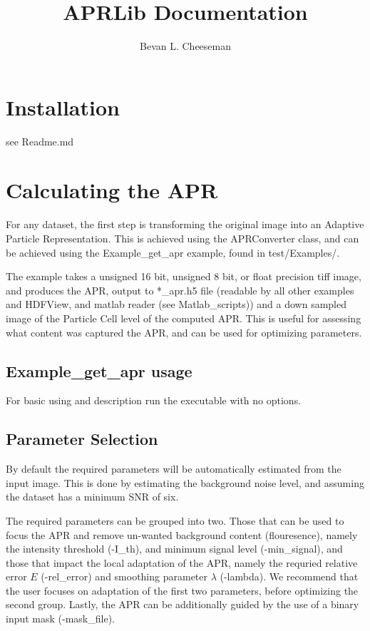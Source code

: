 \documentclass[12pt]{article}
\title{APRLib Documentation}
\author
{Bevan L. Cheeseman}
\begin{document}
\maketitle

\section{Installation}
see Readme.md

\section{Calculating the APR}
For any dataset, the first step is transforming the original image into an Adaptive Particle Representation. This is achieved using the APRConverter class, and can be achieved using the Example\_get\_apr example, found in test/Examples/.

The example takes a unsigned 16 bit, unsigned 8 bit, or float precision tiff image, and produces the APR, output to  *\_apr.h5 file (readable by all other examples and HDFView, and matlab reader (see Matlab\_scripts)) and a down sampled image of the Particle Cell level of the computed APR. This is useful for assessing what content was captured the APR, and can be used for optimizing parameters.
\subsection{Example\_get\_apr usage}
For basic using and description run the executable with no options.
\subsection{Parameter Selection}
By default the required parameters will be automatically estimated from the input image. This is done by estimating the background noise level, and assuming the dataset has a minimum SNR of six. 

The required parameters can be grouped into two. Those that can be used to focus the APR and remove un-wanted background content (flouresence), namely the intensity threshold (-I\_th), and minimum signal level (-min\_signal), and those that impact the local adaptation of the APR, namely the requried relative error $E$ (-rel\_error) and smoothing parameter $\lambda$ (-lambda). We recommend that the user focuses on adaptation of the first two parameters, before optimizing the second group. Lastly, the APR can be additionally guided by the use of a binary input mask (-mask\_file).
\end{document}
